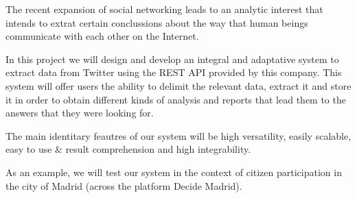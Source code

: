 The recent expansion of social networking leads to an analytic interest that intends to extrat certain conclussions about the way that human beings communicate with each other on the Internet.

In this project we will design and develop an integral and adaptative system to extract data from Twitter using the REST API provided by this company. This system will offer users the ability to delimit the relevant data, extract it and store it in order to obtain different kinds of analysis and reports that lead them to the answers that they were looking for.

The main identitary feautres of our system will be high versatility, easily scalable, easy to use \& result comprehension and high integrability. 

As an example, we will test our system in the context of citizen participation in the city of Madrid (across the platform Decide Madrid).

